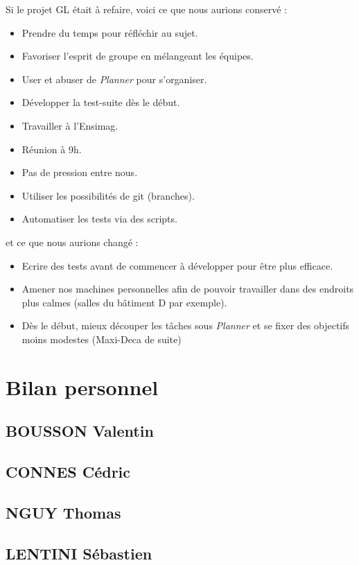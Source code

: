 \documentclass[11pt]{article}
\begin{document}
Si le projet GL était à refaire, voici ce que nous aurions conservé :
\begin{itemize}
\item Prendre du temps pour réfléchir au sujet.
\item Favoriser l'esprit de groupe en mélangeant les équipes.
\item User et abuser de \emph{Planner} pour s'organiser.
\item Développer la test-suite dès le début.
\item Travailler à l'Ensimag.
\item Réunion à 9h.
\item Pas de pression entre nous.
\item Utiliser les possibilités de git (branches). 
\item Automatiser les tests via des scripts.
\end{itemize}

et ce que nous aurions changé : 
\begin{itemize}
\item Ecrire des tests avant de commencer à développer pour être plus efficace.
\item Amener nos machines personnelles afin de pouvoir travailler dans des endroits plus calmes (salles du bâtiment D par exemple).
\item Dès le début, mieux découper les tâches sous \emph{Planner} et se fixer des objectifs moins modestes (Maxi-Deca de suite)
\end{itemize}


\section{Bilan personnel}
\subsection{BOUSSON Valentin}

\subsection{CONNES Cédric}

\subsection{NGUY Thomas}

\subsection{LENTINI Sébastien}

\end{document}
